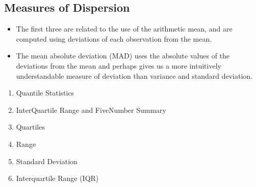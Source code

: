 \documentclass[]{report}
\begin{document}

\subsection{Measures of Dispersion}
\begin{itemize}
\item The first three are related to the use of the arithmetic mean, and are computed using deviations of each observation from the mean.
\item The mean absolute deviation (MAD) uses the absolute values of the deviations from
the mean and perhaps gives us a more intuitively understandable measure of deviation than
variance and standard deviation.
\end{itemize} 




\begin{multicols}{2}
\begin{enumerate}
\item Quantile Statistics
\item InterQuartile Range and FiveNumber Summary

\item Quartiles
\item Range
\item Standard Deviation
\item Interquartile Range (IQR)
\end{enumerate}
\end{multicols}
\end{document}
